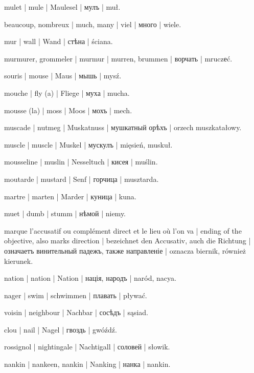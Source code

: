 \begin{outdent}{1em}
mulet | mule | Maulesel | мулъ | muł.

beaucoup, nombreux | much, many | viel | много | wiele.

mur | wall | Wand | стѣна | ściana.

murmurer, grommeler | murmur | murren, brummen | ворчать | mruczеć.

souris | mouse | Maus | мышь | mysź.

mouche | fly (a) | Fliege | муха | mucha.

mousse (la) | moss | Moos | мохъ | mech.

muscade | nutmeg | Muskatnuss | мушкатный орѣхъ | orzech
muszkatałowy.

muscle | muscle | Muskel | мускулъ | mięsień, muskuł.

mousseline | muslin | Nesseltuch | кисея | muślin.

moutarde | mustard | Senf | горчица | musztarda.

martre | marten | Marder | куница | kuna.

muet | dumb | stumm | нѣмой | niemy.

\begin{minipage}{\textwidth}
\begin{outdent}{1em}
marque l’accusatif ou complément direct et le lieu où l’on va | ending of the objective, also marks direction | bezeichnet den
Accusativ, auch die Richtung | означаетъ винительный падежъ, также
направленіе | oznacza biernik, również kierunek.
\end{outdent}
\end{minipage}

nation | nation | Nation | нація, народъ | naród, nacya.

nager | swim | schwimmen | плавать | pływać.

voisin | neighbour | Nachbar | сосѣдъ | sąsiad.

clou | nail | Nagel | гвоздь | gwóźdź.

rossignol | nightingale | Nachtigall | соловей | słowik.

nankin | nankeen, nankin | Nanking | нанка | nankin.


\end{outdent}
